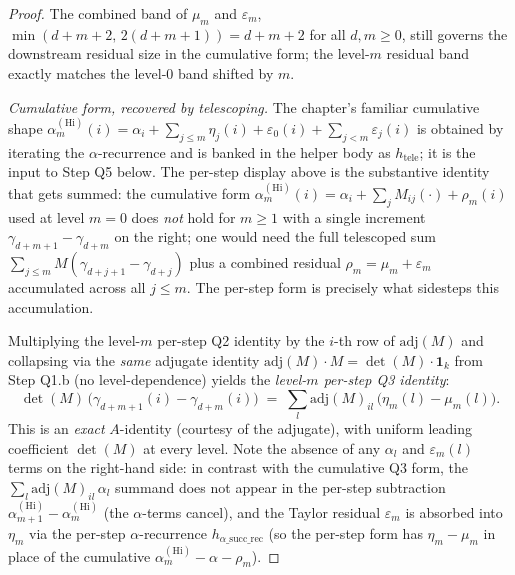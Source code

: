 \begin{proof}
The combined band of $\mu_m$ and $\varepsilon_m$,
$\min(d+m+2,\, 2(d+m+1)) = d+m+2$ for all $d, m \ge 0$, still
governs the downstream residual size in the cumulative form;
the level-$m$ residual band exactly matches the level-$0$ band
shifted by $m$.

\emph{Cumulative form, recovered by telescoping.} The chapter's
familiar cumulative shape
$\alpha^{(\mathrm{Hi})}_m(i) = \alpha_i + \sum_{j \le m}
\eta_j(i) + \varepsilon_0(i) + \sum_{j < m} \varepsilon_j(i)$
is obtained by iterating the $\alpha$-recurrence and is banked
in the helper body as $h_{\mathrm{tele}}$; it is the input to
Step Q5 below. The per-step display above is the substantive
identity that gets summed: the cumulative form
$\alpha^{(\mathrm{Hi})}_m(i) = \alpha_i + \sum_j M_{ij}(\cdot)
+ \rho_m(i)$ used at level $m = 0$ does \emph{not} hold for
$m \ge 1$ with a single increment $\gamma_{d+m+1} - \gamma_{d+m}$
on the right; one would need the full telescoped sum
$\sum_{j \le m} M(\gamma_{d+j+1} - \gamma_{d+j})$ plus a
combined residual $\rho_m = \mu_m + \varepsilon_m$ accumulated
across all $j \le m$. The per-step form is precisely what
sidesteps this accumulation.

Multiplying the level-$m$ per-step Q2 identity by the $i$-th
row of $\mathrm{adj}(M)$ and collapsing via the \emph{same}
adjugate identity $\mathrm{adj}(M) \cdot M = \det(M) \cdot
\mathbf{1}_k$ from Step Q1.b (no level-dependence) yields the
\emph{level-$m$ per-step Q3 identity}:
\[
\det(M)\,\bigl(\gamma_{d+m+1}(i) - \gamma_{d+m}(i)\bigr)
\;=\;
\sum_l \mathrm{adj}(M)_{il}\,\bigl(\eta_m(l) - \mu_m(l)\bigr).
\]
This is an \emph{exact} $A$-identity (courtesy of the adjugate),
with uniform leading coefficient $\det(M)$ at every level. Note
the absence of any $\alpha_l$ and $\varepsilon_m(l)$ terms on
the right-hand side: in contrast with the cumulative Q3 form,
the $\sum_l \mathrm{adj}(M)_{il}\,\alpha_l$ summand does not
appear in the per-step subtraction
$\alpha^{(\mathrm{Hi})}_{m+1} - \alpha^{(\mathrm{Hi})}_m$ (the
$\alpha$-terms cancel), and the Taylor residual $\varepsilon_m$
is absorbed into $\eta_m$ via the per-step $\alpha$-recurrence
$h_{\alpha\mathrm{\_succ\_rec}}$ (so the per-step form has
$\eta_m - \mu_m$ in place of the cumulative
$\alpha^{(\mathrm{Hi})}_m - \alpha - \rho_m$).


\end{proof}
